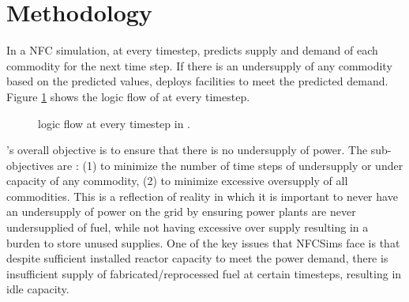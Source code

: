 \section{Methodology}
In a \Cyclus \gls{NFC} simulation, at every timestep, \deploy 
predicts supply and demand of each commodity for the next time 
step. 
If there is an undersupply of any commodity based 
on the predicted values, \deploy deploys facilities to meet 
the predicted demand.  
Figure \ref{fig:flow} shows the logic flow of \deploy 
at every timestep. 

\begin{figure}[H]
	\centering
    \label{fig:flow}
    \caption{\Deploy logic flow at every timestep in \Cyclus \cite{chee_demonstration_2019}.}
\end{figure}

\Deploy's overall objective is to ensure that there is no 
undersupply of power. 
The sub-objectives are : (1) to minimize the number of time 
steps of undersupply or under capacity of any 
commodity, (2) to minimize excessive oversupply of all commodities.
This is a reflection of reality in which it is important to 
never have an undersupply of power on the grid by ensuring power 
plants are never undersupplied of fuel, while not 
having excessive over supply resulting in a burden to store unused 
supplies. 
One of the key issues that \gls{NFCSim}s face is that despite
sufficient installed reactor capacity to meet the power 
demand, there is insufficient supply of fabricated/reprocessed 
fuel at certain timesteps, resulting in idle capacity.  

